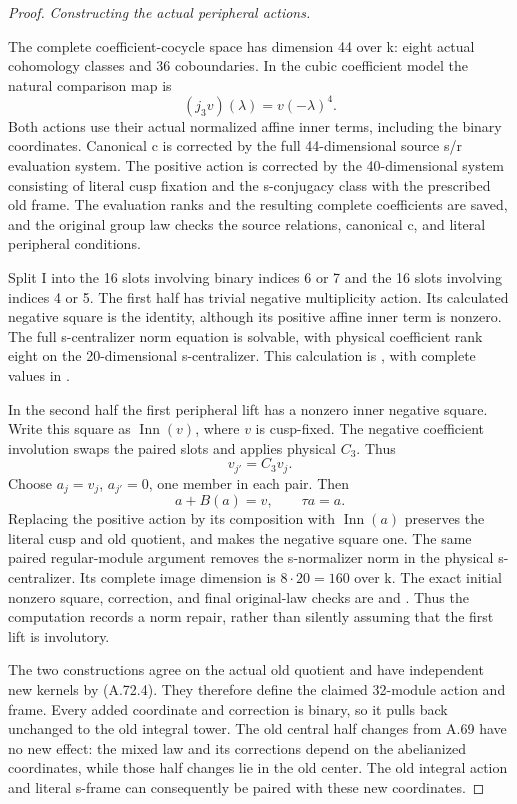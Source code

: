 \begin{proof}
\emph{Constructing the actual peripheral actions.}\par
The complete coefficient-cocycle space has dimension 44 over k:
eight actual cohomology classes and 36 coboundaries. In the cubic
coefficient model the natural comparison map is
\[
 (j_3v)(\lambda)=v(-\lambda)^4.
 \tag{A.72.5}
\]
Both actions use their actual normalized affine inner terms, including
the binary coordinates. Canonical c is corrected by the full
44-dimensional source s/r evaluation system. The positive action is
corrected by the 40-dimensional system consisting of literal cusp
fixation and the s-conjugacy class with the prescribed old frame.
The evaluation ranks and the resulting complete coefficients are
saved, and the original group law checks the source relations,
canonical c, and literal peripheral conditions.

Split I into the 16 slots involving binary indices 6 or 7 and the 16
slots involving indices 4 or 5. The first half has trivial negative
multiplicity action. Its calculated negative square is the identity,
although its positive affine inner term is nonzero. The full
s-centralizer norm equation is solvable, with physical coefficient
rank eight on the 20-dimensional s-centralizer. This calculation is
, with complete values in
.

In the second half the first peripheral lift has a nonzero inner
negative square. Write this square as \(\operatorname{Inn}(v)\),
where \(v\) is cusp-fixed. The negative coefficient involution swaps
the paired slots and applies physical \(C_3\). Thus
\[
 v_{j'}=C_3v_j.
\]
Choose \(a_j=v_j\), \(a_{j'}=0\), one member in each pair. Then
\[
 a+B(a)=v,\qquad \tau a=a.
 \tag{A.72.6}
\]
Replacing the positive action by its composition with
\(\operatorname{Inn}(a)\) preserves the literal cusp and old quotient,
and makes the negative square one. The same paired regular-module
argument removes the s-normalizer norm in the physical s-centralizer.
Its complete image dimension is \(8\cdot20=160\) over k. The exact
initial nonzero square, correction, and final original-law checks are
 and
.
Thus the computation records a norm repair, rather than silently
assuming that the first lift is involutory.

The two constructions agree on the actual old quotient and have
independent new kernels by (A.72.4). They therefore define the claimed
32-module action and frame. Every added coordinate and correction is
binary, so it pulls back unchanged to the old integral tower. The old
central half changes from A.69 have no new effect: the mixed law and
its corrections depend on the abelianized coordinates, while those
half changes lie in the old center. The old integral action and
literal s-frame can consequently be paired with these new coordinates.


\end{proof}
